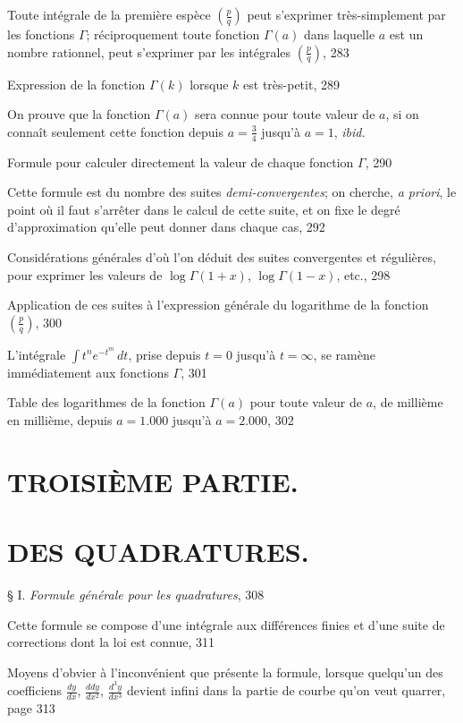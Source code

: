 \documentclass{article}
\begin{document}
Toute intégrale de la première espèce $\left(\frac{p}{q}\right)$ peut s'exprimer très-simplement par les fonctions $\Gamma$; réciproquement toute fonction $\Gamma(a)$ dans laquelle $a$ est un nombre rationnel, peut s'exprimer par les intégrales $\left(\frac{p}{q}\right)$, 283

Expression de la fonction $\Gamma(k)$ lorsque $k$ est très-petit, 289

On prouve que la fonction $\Gamma(a)$ sera connue pour toute valeur de $a$, si on connaît seulement cette fonction depuis $a=\frac{3}{4}$ jusqu'à $a=1$, \emph{ibid.}

Formule pour calculer directement la valeur de chaque fonction $\Gamma$, 290

Cette formule est du nombre des suites \emph{demi-convergentes}; on cherche, \emph{a priori}, le point où il faut s'arrêter dans le calcul de cette suite, et on fixe le degré d'approximation qu'elle peut donner dans chaque cas, 292

Considérations générales d'où l'on déduit des suites convergentes et régulières, pour exprimer les valeurs de $\log\Gamma(1+x)$, $\log\Gamma(1-x)$, etc., 298

Application de ces suites à l'expression générale du logarithme de la fonction $\left(\frac{p}{q}\right)$, 300

L'intégrale $\displaystyle\int t^{n}e^{-t^{m}}\,dt$, prise depuis $t=0$ jusqu'à $t=\infty$, se ramène immédiatement aux fonctions $\Gamma$, 301

Table des logarithmes de la fonction $\Gamma(a)$ pour toute valeur de $a$, de millième en millième, depuis $a=1.000$ jusqu'à $a=2.000$, 302

\section*{TROISIÈME PARTIE.}

\section*{DES QUADRATURES.}

§ I. \emph{Formule générale pour les quadratures}, 308

Cette formule se compose d'une intégrale aux différences finies et d'une suite de corrections dont la loi est connue, 311

Moyens d'obvier à l'inconvénient que présente la formule, lorsque quelqu'un des coefficiens $\frac{dy}{dx}$, $\frac{ddy}{dx^{2}}$, $\frac{d^{3}y}{dx^{3}}$ devient infini dans la partie de courbe qu'on veut quarrer, page 313
\end{document}

